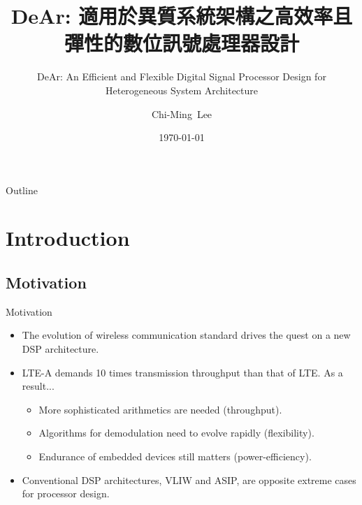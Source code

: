 \documentclass{beamer}
\author{Chi-Ming~Lee}
\institute[National Tsing Hua University] %
{
    Department of Electrial Engineering\\
    National Tsing Hua University
}
\date{\today}
\begin{document}
\begin{CJK}{UTF8}{bkai}

    \title{ DeAr: 適用於異質系統架構之高效率且彈性的數位訊號處理器設計}
    \subtitle{DeAr: An Efficient and Flexible Digital Signal Processor Design for Heterogeneous System Architecture}

    \begin{frame}
        \titlepage
    \end{frame}

    \begin{frame}{Outline}
        \tableofcontents
    \end{frame}


    \section{Introduction}

    \subsection{Motivation}

    \begin{frame}{Motivation}
        \begin{itemize}
            \item {
                    The evolution of wireless communication standard drives the quest on a new DSP architecture.
                }
            \item {
                    LTE-A demands 10 times transmission throughput than that of LTE. As a result...
                    \begin{itemize}
                        \item {
                                More sophisticated arithmetics are needed (throughput).
                            }
                        \item {
                                Algorithms for demodulation need to evolve rapidly (flexibility).
                        }
                        \item {
                                Endurance of embedded devices still matters (power-efficiency).
                        }
                    \end{itemize}
                }
            \item {
                    Conventional DSP architectures, VLIW and ASIP, are opposite extreme cases for processor design.
                }
        \end{itemize}


\end{frame}
\end{CJK}
\end{document}
